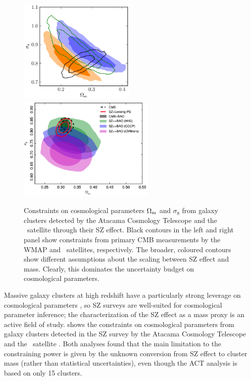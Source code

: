 \begin{figure}
 \centerline{\includegraphics[height=2in]{chapter1/cosmo_SZ_ACT.png}
             \includegraphics[height=2in]{chapter1/cosmo_SZ_Planck.png}}
\caption{Constraints on cosmological parameters $\Omega_{\rm m}$ and $\sigma_8$ from galaxy clusters detected by the Atacama Cosmology Telescope \citep[left, from][]{hasselfield13} and the \planck\ satellite \citep[right, from][]{planck15xxiv} through their SZ effect. Black contours in the left and right panel show constraints from primary CMB measurements by the WMAP and \planck\ satellites, respectively. The broader, coloured contours show different assumptions about the scaling between SZ effect and mass. Clearly, this dominates the uncertainty budget on cosmological parameters.}
\label{f:intro_szcosmo}
\end{figure}

Massive galaxy clusters at high redshift have a particularly strong leverage on cosmological parameters \citep{vikhlinin09_cosmo}, so SZ surveys are well-suited for cosmological parameter inference; the characterization of the SZ effect as a mass proxy is an active field of study.  shows the constraints on cosmological parameters from galaxy clusters detected in the SZ survey by the Atacama Cosmology Telescope \citep[ACT,][]{hasselfield13} and the \planck\ satellite \citep{planck15xxiv}. Both analyses found that the main limitation to the constraining power is given by the unknown conversion from SZ effect to cluster mass (rather than statistical uncertainties), even though the ACT analysis is based on only 15 clusters. 


